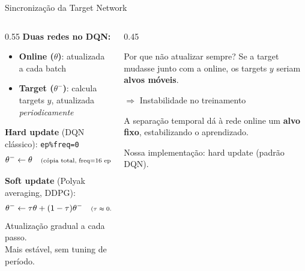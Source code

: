 \documentclass[11pt, xcolor=dvipsnames]{beamer}
\newcommand{\sutil}[1]{\textcolor{textoBase!60}{#1}}
\begin{document}
\begin{frame}{Sincronização da Target Network}
  \footnotesize
  \begin{columns}[T]
    \begin{column}{0.55\textwidth}
      \textbf{Duas redes no DQN:}
      \begin{itemize}
        \item \textbf{Online ($\theta$)}: atualizada a cada batch
        \item \textbf{Target ($\theta^-$)}: calcula targets $y$, atualizada \emph{periodicamente}
      \end{itemize}

      \vspace{2mm}
      \textbf{Hard update} (DQN clássico): \texttt{ep\%freq=0}
      \vspace{-2mm}
      \[
        \theta^- \leftarrow \theta \quad \text{\scriptsize (cópia total, freq=16 ep)}
      \]

      \vspace{1mm}
      \textbf{Soft update} (Polyak averaging, DDPG):
      \vspace{-2mm}
      \[
        \theta^- \leftarrow \tau \theta + (1-\tau) \theta^- \quad \text{\scriptsize ($\tau \approx 0.005$)}
      \]
      {\scriptsize Atualização gradual a cada passo. \\ Mais estável, sem tuning de período.}
    \end{column}
    \begin{column}{0.45\textwidth}
      \begin{alertbox}{Por que não atualizar sempre?}
        \scriptsize
        Se a target mudasse junto com a online, os targets $y$ seriam \textbf{alvos móveis}.

        \vspace{1mm}
        $\Rightarrow$ Instabilidade no treinamento

        \vspace{1mm}
        A separação temporal dá à rede online um \textbf{alvo fixo}, estabilizando o aprendizado.
      \end{alertbox}
      \vspace{2mm}
      {\scriptsize \sutil{Nossa implementação: hard update (padrão DQN).}}
    \end{column}
  \end{columns}
\end{frame}
\end{document}
